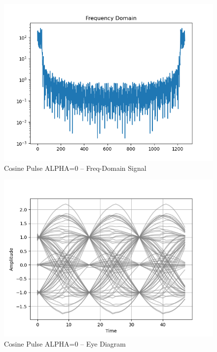 \documentclass[
	letterpaper, %
	10pt, %
]{CSUniSchoolLabReport}
\begin{document}
\begin{figure}[H] %
	\centering %
	\includegraphics[width=1.2\textwidth]{assignment2e.png} %
	\caption{Cosine Pulse ALPHA=0 -- Freq-Domain Signal}
	\label{fig:block}
\end{figure}

\begin{figure}[H] %
	\centering %
	\includegraphics[width=1.2\textwidth]{assignment2f.png} %
	\caption{Cosine Pulse ALPHA=0 -- Eye Diagram}
	\label{fig:block}
\end{figure}
\end{document}
